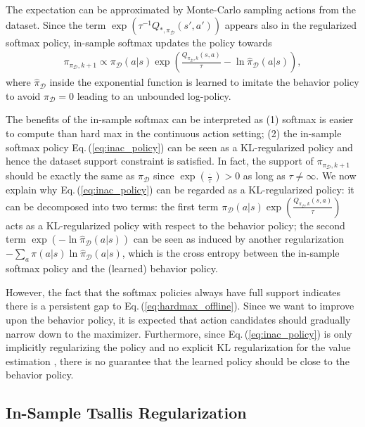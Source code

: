 \documentclass{article}
\newcommand{\AdaBracket}[1]{\left(#1\right)}
\newcommand{\eq}[1]{Eq.\,(#1)}
\newcommand{\datasetOptimalQ}{Q_{*, \pi_{\mathcal{D}}}}
\newcommand{\datasetPolicy}{\pi_{\mathcal{D}}}
\begin{document}
The expectation can be approximated by Monte-Carlo sampling actions from the dataset.
Since the term $\exp\AdaBracket{\tau^{-1}\datasetOptimalQ (s',a')}$ appears also in the regularized softmax policy, in-sample softmax updates the policy towards 
\begin{align}
    \pi_{\datasetPolicy, k+1} \propto  \datasetPolicy(a|s) \exp\AdaBracket{\frac{Q_{\datasetPolicy, k}(s,a)}{\tau} - \ln\hat{\pi}_{\mathcal{D}}(a|s)},
    \label{eq:inac_policy}
\end{align}
where $\hat{\pi}_{\mathcal{D}}$ inside the exponential function is learned to imitate the behavior policy to avoid $\pi_{\mathcal{D}} = 0$ leading to an unbounded log-policy.

The benefits of the in-sample softmax can be interpreted as (1) softmax is easier to compute than hard max in the continuous action setting; 
(2) the in-sample softmax policy \eq{\ref{eq:inac_policy}} can be seen as a KL-regularized policy and hence the dataset support constraint is satisfied.
In fact, the support of $ \pi_{\datasetPolicy, k+1}$ should be exactly the same as $\datasetPolicy$ since $\exp(\frac{\cdot}{\tau}) > 0$ as long as $\tau \neq \infty$.
We now explain why \eq{\ref{eq:inac_policy}} can be regarded as a KL-regularized policy: it can be decomposed into two terms:
the first term $\datasetPolicy(a|s) \exp\AdaBracket{\frac{Q_{\datasetPolicy, k}(s,a)}{\tau} }$ acts as a KL-regularized policy with respect to the behavior policy; 
the second term $\exp\AdaBracket{-\ln\hat{\pi}_{\mathcal{D}}(a|s)}$ can be seen as induced by another regularization $-\sum_{a}{\pi(a|s)}{\ln{\hat{\pi}_{\mathcal{D}}(a|s)}}$, which is the cross entropy between the in-sample softmax policy and the (learned) behavior policy.

However, the fact that the softmax policies always have full support indicates there is a persistent gap to \eq{\ref{eq:hardmax_offline}}.
Since we want to improve upon the behavior policy, it is expected that action candidates should gradually narrow down to the maximizer.
Furthermore, since \eq{\ref{eq:inac_policy}} is only implicitly regularizing the policy and no explicit KL regularization for the value estimation \cite{Wu2020-BehaviorRegularizedAC}, there is no guarantee that the learned policy should be close to the behavior policy.





\subsection{In-Sample Tsallis Regularization}
\end{document}
